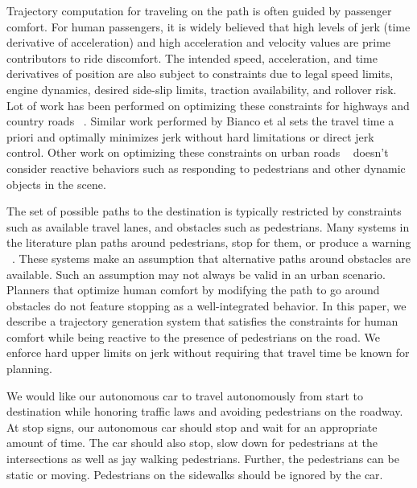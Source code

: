 \documentclass[letterpaper, 10 pt, conference]{ieeeconf}  %
\begin{document}
Trajectory computation for traveling on the path is often guided by passenger comfort. 
For human passengers, it is widely believed that high levels of jerk (time derivative of acceleration) and high acceleration and velocity values are prime contributors to ride discomfort.
The intended speed, acceleration, and time derivatives of position are also subject to constraints
due to legal speed limits, engine dynamics, desired side-slip limits, traction availability, and rollover risk.
Lot of work has been performed on optimizing these constraints for highways and country roads ~\cite{ziegler14,bahram15,xu12,CHEB15CI}.
Similar work performed by Bianco et al \cite{GuarinoLoBianco2004,GuarinoLoBianco2005,Bianco2007,Bianco2009,GuarinoLoBianco2013} sets the travel time a priori and optimally minimizes jerk without hard limitations or direct jerk control.
Other work on optimizing these constraints on urban roads ~\cite{Rastelli14,Li15} doesn't consider reactive behaviors such as responding to pedestrians and other dynamic objects in the scene.

The set of possible paths to the destination is typically restricted
by constraints such as available travel lanes, and obstacles such as pedestrians.
Many systems in the literature plan paths around pedestrians, stop for them, or produce a warning ~\cite{pradalier05,benenson06,gu14,mogelmose15,johnson13}. 
These systems make an assumption that alternative paths around obstacles are available. Such an assumption may not always be valid in an urban scenario.
Planners that optimize human comfort by modifying the path to go around obstacles \cite{Villagra2012,Villagra2012a} do not feature stopping as a well-integrated behavior.
In this paper, we describe a trajectory generation system that satisfies the constraints for human comfort while being reactive to the presence of pedestrians on the road. We enforce hard upper limits on jerk without requiring that travel time be known for planning.

We would like our autonomous car to travel autonomously from start to destination while honoring traffic laws and avoiding pedestrians on the roadway.
At stop signs, our autonomous car should stop and wait for an appropriate amount of time.
The car should also stop, slow down for pedestrians %
at the intersections as well as jay walking pedestrians.
Further, the pedestrians can be static or moving.
Pedestrians on the sidewalks should be ignored by the car.
\end{document}
